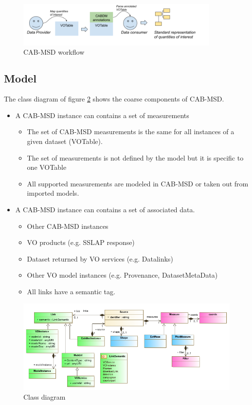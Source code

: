 \documentclass[11pt,a4paper]{ivoa}
\begin{document}
\begin{figure}
\centering
\includegraphics[width=0.9\textwidth]{fig1.png}
\caption{CAB-MSD workflow}
\label{fig:workflow}
\end{figure}


\subsection{Model}

The class diagram of figure \ref{fig:classdiag} shows the coarse components of CAB-MSD. 

\begin{itemize}
    \item A CAB-MSD instance can contains a set of measurements
    \begin{itemize}
        \item The set of CAB-MSD measurements is the same for all instances of a given dataset (VOTable).
        \item The set of measurements is not defined by the model but it is specific to one VOTable
        \item All supported measurements are modeled in CAB-MSD or taken out from imported models.
    \end{itemize}
\item A CAB-MSD instance can contains a set of associated data.
    \begin{itemize}
        \item Other CAB-MSD instances
        \item VO products (e.g. SSLAP response)
        \item Dataset returned by VO services (e.g. Datalinks)
        \item Other VO model instances (e.g. Provenance, DatasetMetaData)
        \item All links have a semantic tag.
    \end{itemize}
\end{itemize}


\begin{figure}
\centering
\includegraphics[width=1.0\textwidth]{CABSDM_diagram.png}
\caption{Class diagram}
\label{fig:classdiag}
\end{figure}
\end{document}
